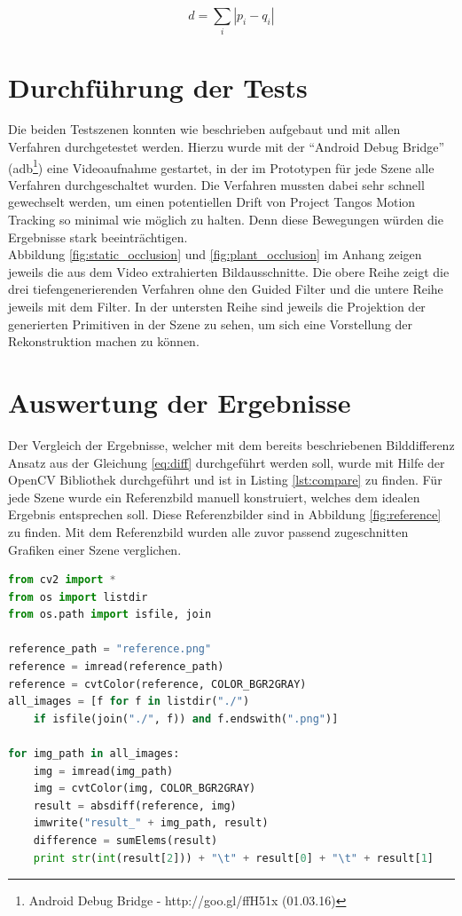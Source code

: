 \begin{equation} \label{eq:diff}
d = \sum_i |p_i-q_i|
\end{equation}

\section{Durchführung der Tests}

Die beiden Testszenen konnten wie beschrieben aufgebaut und mit allen Verfahren durchgetestet werden. Hierzu wurde mit der \enquote{Android Debug Bridge} (adb\footnote{Android Debug Bridge - http://goo.gl/ffH51x (01.03.16)}) eine Videoaufnahme gestartet, in der im Prototypen für jede Szene alle Verfahren durchgeschaltet wurden. Die Verfahren mussten dabei sehr schnell gewechselt werden, um einen potentiellen Drift von Project Tangos Motion Tracking so minimal wie möglich zu halten. Denn diese Bewegungen würden die Ergebnisse stark beeinträchtigen. \\

Abbildung \ref{fig:static_occlusion} und \ref{fig:plant_occlusion} im Anhang zeigen jeweils die aus dem Video extrahierten Bildausschnitte. Die obere Reihe zeigt die drei tiefengenerierenden Verfahren ohne den Guided Filter und die untere Reihe jeweils mit dem Filter. In der untersten Reihe sind jeweils die Projektion der generierten Primitiven in der Szene zu sehen, um sich eine Vorstellung der Rekonstruktion machen zu können.

\section{Auswertung der Ergebnisse}

Der Vergleich der Ergebnisse, welcher mit dem bereits beschriebenen Bilddifferenz Ansatz aus der Gleichung \ref{eq:diff} durchgeführt werden soll, wurde mit Hilfe der OpenCV Bibliothek durchgeführt und ist in Listing \ref{lst:compare} zu finden. Für jede Szene wurde ein Referenzbild manuell konstruiert, welches dem idealen Ergebnis entsprechen soll. Diese Referenzbilder sind in Abbildung \ref{fig:reference} zu finden. Mit dem Referenzbild wurden alle zuvor passend zugeschnitten Grafiken einer Szene verglichen. \\

\begin{lstlisting}[mathescape,caption=Python Implementierung der Bilddifferenz, label=lst:compare, language=Python]
from cv2 import *
from os import listdir
from os.path import isfile, join

reference_path = "reference.png"
reference = imread(reference_path)
reference = cvtColor(reference, COLOR_BGR2GRAY)
all_images = [f for f in listdir("./") 
    if isfile(join("./", f)) and f.endswith(".png")]
    
for img_path in all_images:
    img = imread(img_path)
    img = cvtColor(img, COLOR_BGR2GRAY)
    result = absdiff(reference, img)
    imwrite("result_" + img_path, result)
    difference = sumElems(result)
    print str(int(result[2])) + "\t" + result[0] + "\t" + result[1]
\end{lstlisting}

